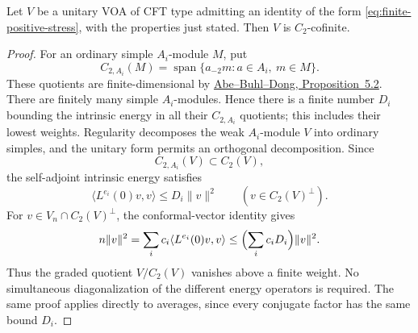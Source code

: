 \begin{lemma}
Let $V$ be a unitary VOA of CFT type admitting an identity of the form
\eqref{eq:finite-positive-stress}, with the properties just stated.
Then $V$ is $C_2$-cofinite.
\end{lemma}
\begin{proof}
For an ordinary simple $A_i$-module $M$, put
\[
 C_{2,A_i}(M)=\operatorname{span}\{a_{-2}m:a\in A_i,\ m\in M\}.
\]
These quotients are finite-dimensional by
\href{https://arxiv.org/html/math/0204021#S5}{Abe--Buhl--Dong,
Proposition~5.2}. There are finitely many simple $A_i$-modules. Hence
there is a finite number $D_i$ bounding the intrinsic energy in all
their $C_{2,A_i}$ quotients; this includes their lowest weights.
Regularity decomposes the weak $A_i$-module $V$ into ordinary simples,
and the unitary form permits an orthogonal decomposition. Since
\[
 C_{2,A_i}(V)\subset C_2(V),
\]
the self-adjoint intrinsic energy satisfies
\[
 \langle L^{e_i}(0)v,v\rangle\le D_i\|v\|^2
 \qquad (v\in C_2(V)^\perp).
\]
For $v\in V_n\cap C_2(V)^\perp$, the conformal-vector identity gives
\[
 n\|v\|^2
 =\sum_i c_i\langle L^{e_i}(0)v,v\rangle
 \le\Bigl(\sum_i c_iD_i\Bigr)\|v\|^2.
\]
Thus the graded quotient $V/C_2(V)$ vanishes above a finite weight.
No simultaneous diagonalization of the different energy operators is
required. The same proof applies directly to averages, since every
conjugate factor has the same bound $D_i$.
\end{proof}

